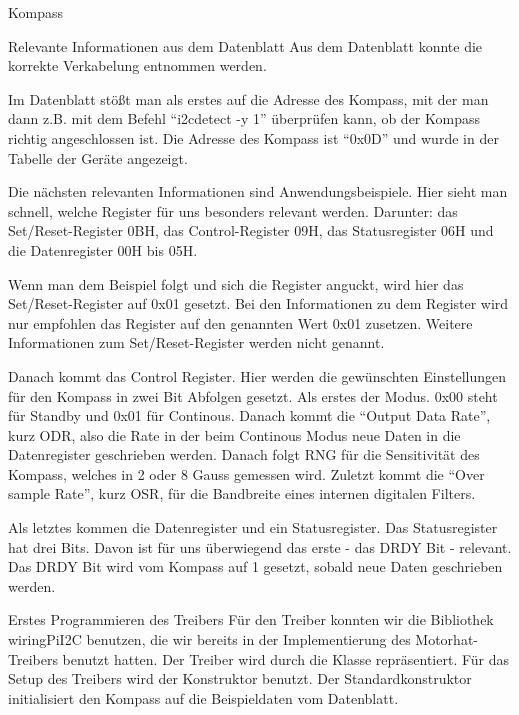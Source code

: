 \documentclass[12pt]{report}
\begin{document}
\begin{section}{Kompass}
  \begin{subsection}{Relevante Informationen aus dem Datenblatt}
    Aus dem Datenblatt \cite{datasheetMagnet} konnte die korrekte Verkabelung
    entnommen werden.

  Im Datenblatt stößt man als erstes auf die \itoc{} Adresse des Kompass, mit der man dann z.B. mit dem Befehl 
  "`i2cdetect -y 1"' überprüfen kann, ob der Kompass richtig angeschlossen ist. Die Adresse des Kompass ist "`0x0D"' 
  und wurde in der Tabelle der \itoc{} Geräte angezeigt.
  
  Die nächsten relevanten Informationen sind Anwendungsbeispiele. Hier sieht man schnell, welche Register für 
  uns besonders relevant werden. Darunter: das Set/Reset-Register 0BH, das
  Control-Register 09H, das Statusregister 06H und die Datenregister 00H bis 05H. 
  
  Wenn man dem Beispiel folgt und sich die Register anguckt, wird hier das Set/Reset-Register auf 0x01 gesetzt.
  Bei den Informationen zu dem Register wird nur empfohlen das Register auf den genannten Wert 0x01 zusetzen. 
  Weitere Informationen zum Set/Reset-Register werden nicht genannt.
  
  Danach kommt das Control Register. Hier werden die gewünschten Einstellungen für den Kompass in zwei Bit 
  Abfolgen gesetzt. Als erstes der Modus. 0x00 steht für Standby und 0x01 für
  Continous. Danach kommt die "`Output Data Rate"', kurz ODR, 
  also die Rate in der beim Continous Modus neue Daten in die Datenregister
  geschrieben werden. Danach folgt RNG für die 
  Sensitivität des Kompass, welches in 2 oder 8 Gauss gemessen wird. Zuletzt
  kommt die "`Over sample Rate"', kurz OSR, für die Bandbreite eines internen digitalen Filters.
  
  Als letztes kommen die Datenregister und ein Statusregister. Das Statusregister hat drei Bits. Davon ist für 
  uns überwiegend das erste - das DRDY Bit - relevant. Das DRDY Bit wird vom Kompass auf 1 gesetzt, sobald neue Daten 
  geschrieben werden.
  \end{subsection}
  \begin{subsection}{Erstes Programmieren des Treibers}
  Für den Treiber konnten wir die \wiringPi{} Bibliothek wiringPiI2C benutzen, die wir bereits in der 
  Implementierung des Motorhat-Treibers benutzt hatten. Der Treiber wird durch
  die Klasse  repräsentiert. Für das Setup des Treibers wird der Konstruktor benutzt. 
  Der Standardkonstruktor initialisiert den Kompass auf die Beispieldaten vom Datenblatt.
  

\end{subsection}
\end{section}
\end{document}
